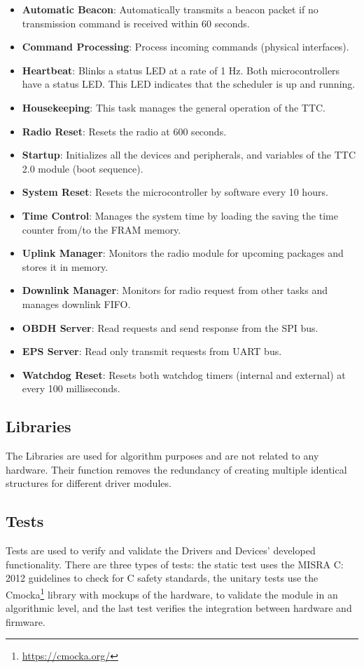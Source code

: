 \begin{itemize}
    \item \textbf{Automatic Beacon}: Automatically transmits a beacon packet if no transmission command is received within 60 seconds.
    \item \textbf{Command Processing}: Process incoming commands (physical interfaces).
    \item \textbf{Heartbeat}: Blinks a status LED at a rate of 1 Hz. Both microcontrollers have a status LED. This LED indicates that the scheduler is up and running.
    \item \textbf{Housekeeping}: This task manages the general operation of the TTC.
    \item \textbf{Radio Reset}: Resets the radio at 600 seconds.
    \item \textbf{Startup}: Initializes all the devices and peripherals, and variables of the TTC 2.0 module (boot sequence).
    \item \textbf{System Reset}: Resets the microcontroller by software every 10 hours.
    \item \textbf{Time Control}: Manages the system time by loading the saving the time counter from/to the FRAM memory.
    \item \textbf{Uplink Manager}: Monitors the radio module for upcoming packages and stores it in memory.
    \item \textbf{Downlink Manager}: Monitors for radio request from other tasks and manages downlink FIFO.
    \item \textbf{OBDH Server}: Read requests and send response from the SPI bus.
    \item \textbf{EPS Server}: Read only transmit requests from UART bus.
    \item \textbf{Watchdog Reset}: Resets both watchdog timers (internal and external) at every 100 milliseconds.
\end{itemize}

\subsection{Libraries}

The Libraries are used for algorithm purposes and are not related to any hardware. Their function removes the redundancy of creating multiple identical structures for different driver modules.

\subsection{Tests}

Tests are used to verify and validate the Drivers and Devices' developed functionality. There are three types of tests: the static test uses the MISRA C: 2012 \cite{misrac2012} guidelines to check for C safety standards, the unitary tests use the Cmocka\footnote{\href{https://cmocka.org/}{https://cmocka.org/}} library with mockups of the hardware, to validate the module in an algorithmic level, and the last test verifies the integration between hardware and firmware.
